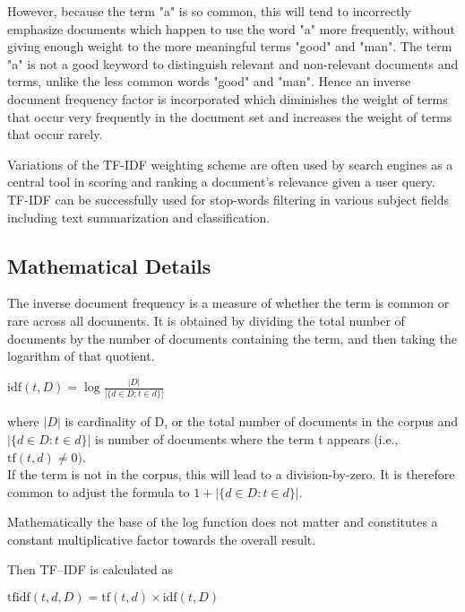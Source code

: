 However, because the term "a" is so common, this will tend to incorrectly emphasize documents which happen to use the word "a" more frequently, without giving enough weight to the more meaningful terms "good" and "man". The term "a" is not a good keyword to distinguish relevant and non-relevant documents and terms, unlike the less common words "good" and "man". Hence an inverse document frequency factor is incorporated which diminishes the weight of terms that occur very frequently in the document set and increases the weight of terms that occur rarely.


Variations of the TF-IDF weighting scheme are often used by search engines as a central tool in scoring and ranking a document's relevance given a user query. TF-IDF can be successfully used for stop-words filtering in various subject fields including text summarization and classification.


\subsection{Mathematical Details}\label{sec:bg_detail}

The inverse document frequency is a measure of whether the term is common or rare across all documents. It is obtained by dividing the total number of documents by the number of documents containing the term, and then taking the logarithm of that quotient.

\begin{center}
\smallskip
$\mathrm{idf}(t, D) = \log \frac{\displaystyle |D|}{\displaystyle |\{d \in D: t \in d\}|}$
\smallskip
\end{center}


where $|D|$ is cardinality of D, or the total number of documents in the corpus and $|\{d \in D: t \in d\}|$ is number of documents where the term t appears (i.e., $\mathrm{tf}(t,d) \neq 0)$. \\

If the term is not in the corpus, this will lead to a division-by-zero. It is therefore common to adjust the formula to $1 + |\{d \in D: t \in d\}|$.

Mathematically the base of the log function does not matter and constitutes a constant multiplicative factor towards the overall result.

Then TF–IDF is calculated as
\begin{center}
\smallskip
$\mathrm{tfidf}(t,d,D) = \mathrm{tf}(t,d) \times \mathrm{idf}(t, D)$ 
\smallskip
\end{center}

